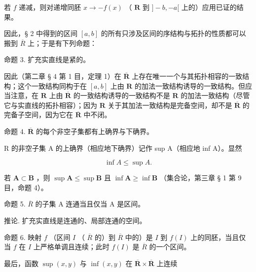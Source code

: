 若 \(f\) 递减，则对递增同胚 \(x \to -f(x)\) （ \(\mathbf{R}\) 到 \(] - b, - a[\) 上的）应用已证的结果。

因此，§ 2 中得到的区间 \([a, b]\) 的所有只涉及区间的序结构与拓扑的性质都可以搬到 \(\overline{R}\) 上；于是有下列命题：

命题 3. 扩充实直线是紧的。

因此（第二章 § 4 第 1 目，定理 1）在 \(\overline{\mathbf{R}}\) 上存在唯一一个与其拓扑相容的一致结构；这个一致结构同构于在 \([a, b]\) 上由 \(\mathbf{R}\) 的加法一致结构诱导的一致结构。但应当注意，在 \(\mathbf{R}\) 上由 \(\overline{\mathbf{R}}\) 的一致结构诱导的一致结构不是 \(\mathbf{R}\) 的加法一致结构（尽管它与实直线的拓扑相容）；因为 \(\mathbf{R}\) 关于其加法一致结构是完备空间，却不是 \(\overline{\mathbf{R}}\) 的完备子空间，因为它在 \(\overline{\mathbf{R}}\) 中不闭。

命题 4. \(\overline{\mathbf{R}}\) 的每个非空子集都有上确界与下确界。

R 的非空子集 A 的上确界（相应地下确界）记作 sup A（相应地 inf A）。显然

\[
\inf A \leqslant \sup A.\tag{1}
\]

若 \(\mathbf{A} \subset \mathbf{B}\) ，则 \(\sup \mathbf{A} \leqslant \sup \mathbf{B}\) 且 \(\inf \mathbf{A} \geqslant \inf \mathbf{B}\) （集合论，第三章 § 1 第 9 目，命题 4）。

命题 5. \(\overline{R}\) 的子集 A 连通当且仅当 A 是区间。

推论. 扩充实直线是连通的、局部连通的空间。

命题 6. 映射 \(f\) （区间 \(I\) （ \(\overline{R}\) 的）到 \(\overline{R}\) 中的）是 \(I\) 到 \(f(I)\) 上的同胚，当且仅当 \(f\) 在 \(I\) 上严格单调且连续；此时 \(f(I)\) 是 \(\overline{R}\) 的一个区间。

最后，函数 \(\sup (x,y)\) 与 \(\inf (x,y)\) 在 \(\overline{\mathbf{R}}\times \overline{\mathbf{R}}\) 上连续

